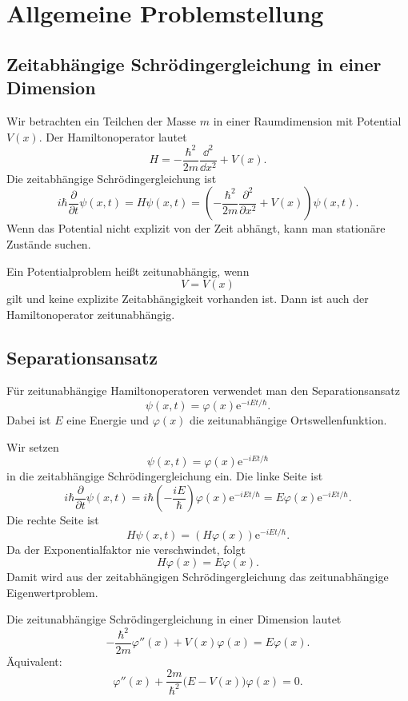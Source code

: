 \section{Allgemeine Problemstellung}

\subsection{Zeitabhängige Schrödingergleichung in einer Dimension}

Wir betrachten ein Teilchen der Masse $m$ in einer Raumdimension mit Potential $V(x)$. Der Hamiltonoperator lautet
\[
    H=-\frac{\hbar^2}{2m}\frac{\dd^2}{\dd x^2}+V(x).
\]
Die zeitabhängige Schrödingergleichung ist
\[
    i\hbar\frac{\partial}{\partial t}\psi(x,t)
    =H\psi(x,t)
    =\left(-\frac{\hbar^2}{2m}\frac{\partial^2}{\partial x^2}+V(x)\right)\psi(x,t).
\]
Wenn das Potential nicht explizit von der Zeit abhängt, kann man stationäre Zustände suchen.

\begin{definitionbox}
Ein Potentialproblem heißt zeitunabhängig, wenn
\[
    V=V(x)
\]
gilt und keine explizite Zeitabhängigkeit vorhanden ist. Dann ist auch der Hamiltonoperator zeitunabhängig.
\end{definitionbox}

\subsection{Separationsansatz}

Für zeitunabhängige Hamiltonoperatoren verwendet man den Separationsansatz
\[
    \psi(x,t)=\varphi(x)\mathrm{e}^{-iEt/\hbar}.
\]
Dabei ist $E$ eine Energie und $\varphi(x)$ die zeitunabhängige Ortswellenfunktion.

\begin{derivationbox}
Wir setzen
\[
    \psi(x,t)=\varphi(x)\mathrm{e}^{-iEt/\hbar}
\]
in die zeitabhängige Schrödingergleichung ein. Die linke Seite ist
\[
    i\hbar\frac{\partial}{\partial t}\psi(x,t)
    =i\hbar\left(-\frac{iE}{\hbar}\right)\varphi(x)\mathrm{e}^{-iEt/\hbar}
    =E\varphi(x)\mathrm{e}^{-iEt/\hbar}.
\]
Die rechte Seite ist
\[
    H\psi(x,t)=\left(H\varphi(x)\right)\mathrm{e}^{-iEt/\hbar}.
\]
Da der Exponentialfaktor nie verschwindet, folgt
\[
    H\varphi(x)=E\varphi(x).
\]
Damit wird aus der zeitabhängigen Schrödingergleichung das zeitunabhängige Eigenwertproblem.
\end{derivationbox}

\begin{formulabox}
Die zeitunabhängige Schrödingergleichung in einer Dimension lautet
\[
    -\frac{\hbar^2}{2m}\varphi''(x)+V(x)\varphi(x)=E\varphi(x).
\]
Äquivalent:
\[
    \varphi''(x)+\frac{2m}{\hbar^2}\bigl(E-V(x)\bigr)\varphi(x)=0.
\]
\end{formulabox}

